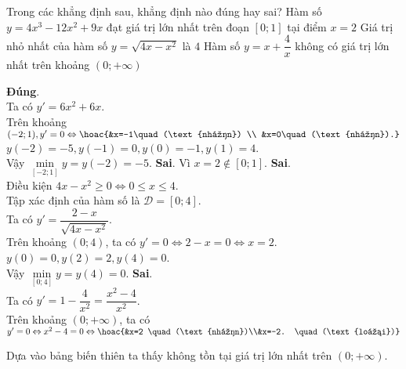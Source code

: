 \begin{ex}%
	Trong các khẳng định sau, khẳng định nào đúng hay sai?
{		Hàm số $y=4 x^3-12 x^2+9 x$ đạt giá trị lớn nhất trên đoạn $[0 ; 1]$ tại điểm $x=2$}
{Giá trị nhỏ nhất của hàm số $y=\sqrt{4 x-x^2}$ là $4$}
{Hàm số $y=x+\dfrac{4}{x}$ không có giá trị lớn nhất trên khoảng $(0 ;+\infty)$}
\loigiai
{
\begin{itemchoice}
\itemch \textbf{Đúng}. \\
Ta có $y'=6 x^2+6 x$.\\
Trên khoảng $(-2 ; 1), y'=0 \Leftrightarrow \hoac{&x=-1\quad(\text{nhận}) \\ &x=0\quad(\text{nhận}).}$ \\
$y(-2)=-5, y(-1)=0, y(0)=-1, y(1)=4$.\\
Vậy $\min\limits_{[-2;1]} y=y(-2)=-5$.
\itemch \textbf{Sai}. Vì $x=2 \notin \left[0;1\right]$.%
\itemch \textbf{Sai}.  \\%
 Điều kiện $4 x-x^2 \geq 0 \Leftrightarrow 0 \leq x \leq 4$. \\
 Tập xác định của hàm số là $\mathscr{D}=[0 ; 4]$.\\
Ta có $y'=\dfrac{2-x}{\sqrt{4 x-x^2}}$.\\
 Trên khoảng $(0 ; 4)$, ta có $y'=0 \Leftrightarrow 2-x=0 \Leftrightarrow x=2$. \\
 $y(0)=0, y(2)=2, y(4)=0$. \\
 Vậy $\min \limits_{[0;4]} y=y(4)=0$.
\itemch \textbf{Sai}.\\ %
Ta có $y'=1-\dfrac{4}{x^2}=\dfrac{x^2-4}{x^2}$.\\
Trên khoảng $\left(0;+\infty\right)$, ta có $y'=0 \Leftrightarrow x^2-4=0 \Leftrightarrow \hoac{&x=2 \quad(\text{nhận})\\&x=-2. \quad(\text{loại})}$
\begin{center}
\end{center}
Dựa vào bảng biến thiên ta thấy không tồn tại giá trị lớn nhất trên $(0;+\infty)$.
\end{itemchoice}
}
\end{ex}
